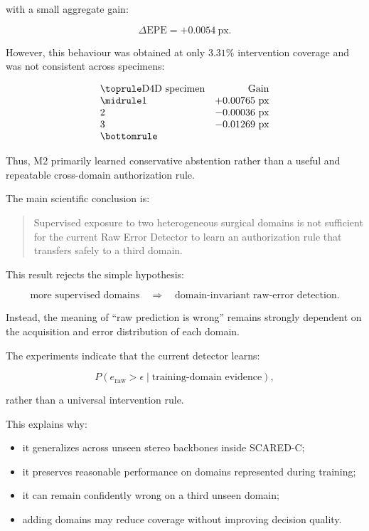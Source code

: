 \documentclass[11pt,a4paper]{article}
\begin{document}
with a small aggregate gain:

\[
\Delta\mathrm{EPE}=+0.0054\ \text{px}.
\]

However, this behaviour was obtained at only \(3.31\%\) intervention coverage and was not consistent across specimens:

\[
\begin{array}{lr}
\toprule
\text{D4D specimen} & \text{Gain}\\
\midrule
1 & +0.00765\ \text{px}\\
2 & -0.00036\ \text{px}\\
3 & -0.01269\ \text{px}\\
\bottomrule
\end{array}
\]

Thus, M2 primarily learned conservative abstention rather than a useful and repeatable cross-domain authorization rule.

The main scientific conclusion is:

\begin{quote}
Supervised exposure to two heterogeneous surgical domains is not sufficient for the current Raw Error Detector to learn an authorization rule that transfers safely to a third domain.
\end{quote}

This result rejects the simple hypothesis:

\[
\text{more supervised domains}
\quad\Longrightarrow\quad
\text{domain-invariant raw-error detection}.
\]

Instead, the meaning of ``raw prediction is wrong'' remains strongly dependent on the acquisition and error distribution of each domain.

The experiments indicate that the current detector learns:

\[
P
\left(
e_{\mathrm{raw}}>\epsilon
\mid
\text{training-domain evidence}
\right),
\]

rather than a universal intervention rule.

This explains why:

\begin{itemize}
    \item it generalizes across unseen stereo backbones inside SCARED-C;
    \item it preserves reasonable performance on domains represented during training;
    \item it can remain confidently wrong on a third unseen domain;
    \item adding domains may reduce coverage without improving decision quality.
\end{itemize}
\end{document}
